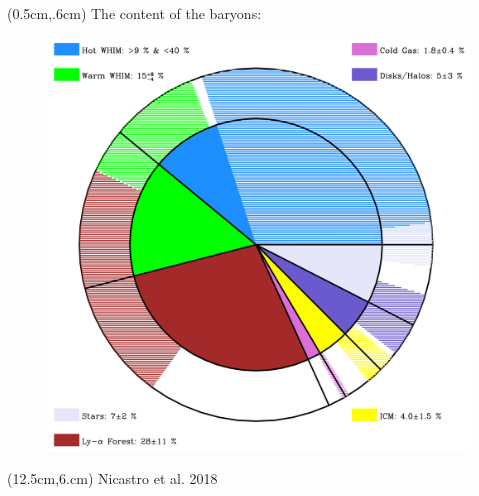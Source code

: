 \documentclass[aspectratio=169]{beamer}
\begin{document}
\begin{frame}[plain,t]
    \begin{textblock*}{4cm}(0.5cm,.6cm)
        {The content of the baryons:}
    \end{textblock*}
    \begin{figure}
        \includegraphics[height=\textheight]{baryon-fraction.png}
    \end{figure}
    \begin{textblock*}{3cm}(12.5cm,6.cm)
        {Nicastro et al. 2018}
    \end{textblock*}
\end{frame}
\end{document}
